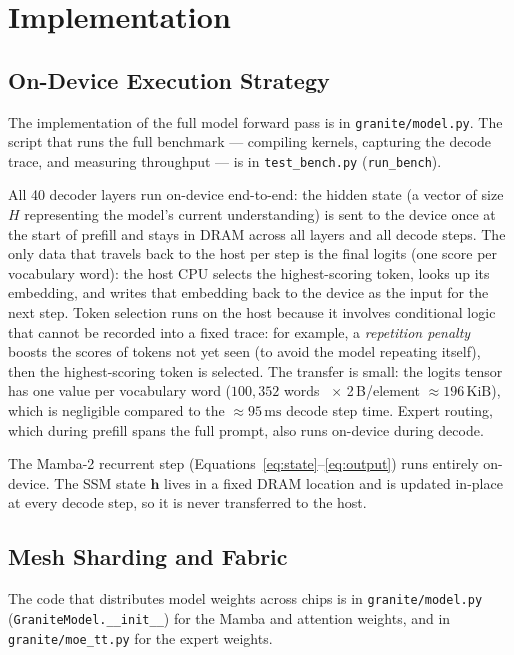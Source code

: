 \section{Implementation}

\subsection{On-Device Execution Strategy}

The implementation of the full model forward pass is in \texttt{granite/\allowbreak model.py}. The script that runs the full benchmark --- compiling kernels, capturing the decode trace, and measuring throughput --- is in \texttt{test\_bench.py} (\texttt{run\_bench}).

All 40 decoder layers run on-device end-to-end: the hidden state (a vector of size $H$ representing the model's current understanding) is sent to the device once at the start of prefill and stays in DRAM across all layers and all decode steps. The only data that travels back to the host per step is the final logits (one score per vocabulary word): the host CPU selects the highest-scoring token, looks up its embedding, and writes that embedding back to the device as the input for the next step. Token selection runs on the host because it involves conditional logic that cannot be recorded into a fixed trace: for example, a \emph{repetition penalty} boosts the scores of tokens not yet seen (to avoid the model repeating itself), then the highest-scoring token is selected. The transfer is small: the logits tensor has one value per vocabulary word ($100{,}352$ words~\citep{ibmgranite2025tinyconfig} $\times$ 2\,B/element $\approx 196\,\text{KiB}$), which is negligible compared to the ${\approx}95\,\text{ms}$ decode step time. Expert routing, which during prefill spans the full prompt, also runs on-device during decode.

The Mamba-2 recurrent step (Equations~\ref{eq:state}--\ref{eq:output}) runs entirely on-device. The SSM state $\mathbf{h}$ lives in a fixed DRAM location and is updated in-place at every decode step, so it is never transferred to the host.

\subsection{Mesh Sharding and Fabric}
\label{sec:mesh-sharding}

The code that distributes model weights across chips is in \texttt{granite/\allowbreak model.py} (\texttt{GraniteModel.\_\_init\_\_}) for the Mamba and attention weights, and in \texttt{granite/\allowbreak moe\_tt.py} for the expert weights.

